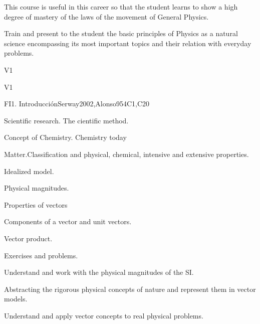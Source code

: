 \begin{syllabus}


\begin{justification}
This course is useful in this career so that the student learns to show a high degree of mastery of the laws of the movement of General Physics.
\end{justification}

\begin{goals}
\item Train and present to the student the basic principles of Physics as a natural science encompassing its most important topics and their relation  with everyday problems.
\end{goals}

\begin{outcomes}{V1}
  \item {}
  \item {}
  \item {}
\end{outcomes}

\begin{competences}{V1}
    \item {}
    \item {}
\end{competences}

\begin{unit}{FI1. Introducción}{}{Serway2002,Alonso95}{4}{C1,C20}
\begin{topics}
      \item Scientific research. The cientific method.
      \item Concept of Chemistry. Chemistry today
      \item Matter.Classification and physical, chemical, intensive and extensive properties. 
      \item Idealized model.
      \item Physical magnitudes.
      \item Properties of vectors
      \item Components of a vector and unit vectors.
      \item Vector product.
      \item Exercises and problems.
   \end{topics}

   \begin{learningoutcomes}
      \item Understand and work with the physical magnitudes of the SI.
      \item Abstracting the rigorous physical concepts of nature and represent them in vector models.
      \item Understand and apply vector concepts to real physical problems.
   \end{learningoutcomes}
\end{unit}


\end{syllabus}
